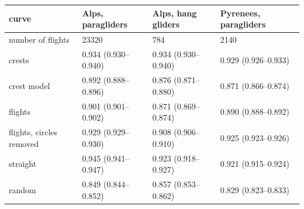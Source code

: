 \begin{tabular}{llll}
\toprule
curve & Alps, paragliders & Alps, hang gliders & Pyrenees, paragliders \\
\midrule
number of flights & 23320 & 784 & 2140 \\
crests & 0.934 (0.930--0.940) & 0.934 (0.930--0.940) & 0.929 (0.926--0.933) \\
crest model & 0.892 (0.888--0.896) & 0.876 (0.871--0.880) & 0.871 (0.866--0.874) \\
flights & 0.901 (0.901--0.902) & 0.871 (0.869--0.874) & 0.890 (0.888--0.892) \\
flights, circles removed & 0.929 (0.929--0.930) & 0.908 (0.906--0.910) & 0.925 (0.923--0.926) \\
straight & 0.945 (0.941--0.947) & 0.923 (0.918--0.927) & 0.921 (0.915--0.924) \\
random & 0.849 (0.844--0.852) & 0.857 (0.853--0.862) & 0.829 (0.823--0.833) \\
\bottomrule
\end{tabular}
